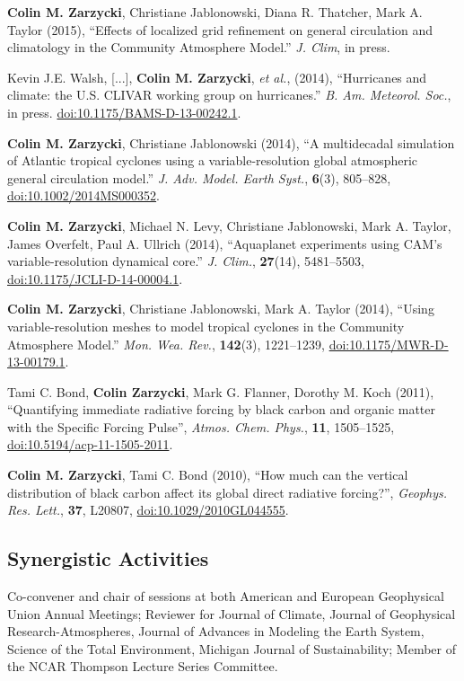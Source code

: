\documentclass[11pt]{article}
\begin{document}
\begin{bibenum}[itemsep=0pt]
\item {\bf Colin M. Zarzycki}, Christiane Jablonowski, Diana R. Thatcher, Mark A. Taylor (2015), ``Effects of localized grid refinement on general circulation and climatology in the Community Atmosphere Model.'' {\em J. Clim}, in press.
\item Kevin J.E. Walsh, [...], {\bf Colin M. Zarzycki}, {\it et al.}, (2014), ``Hurricanes and climate: the U.S. CLIVAR working group on hurricanes.'' {\em B. Am. Meteorol. Soc.}, in press. \href{http://dx.doi.org/10.1175/BAMS-D-13-00242.1}{doi:10.1175/BAMS-D-13-00242.1}.
\item {\bf Colin M. Zarzycki}, Christiane Jablonowski (2014), ``A multidecadal simulation of Atlantic tropical cyclones using a variable-resolution global atmospheric general circulation model.'' {\em J. Adv. Model. Earth Syst.}, {\bf6}(3), 805--828, \href{http://dx.doi.org/10.1002/2014MS000352}{doi:10.1002/2014MS000352}.
\item {\bf Colin M. Zarzycki}, Michael N. Levy, Christiane Jablonowski, Mark A. Taylor, James Overfelt, Paul A. Ullrich (2014), ``Aquaplanet experiments using CAM's variable-resolution dynamical core.'' {\em J. Clim.}, {\bf27}(14), 5481--5503, \href{http://dx.doi.org/10.1175/JCLI-D-14-00004.1}{doi:10.1175/JCLI-D-14-00004.1}.
\item {\bf Colin M. Zarzycki}, Christiane Jablonowski, Mark A. Taylor (2014), ``Using variable-resolution meshes to model tropical cyclones in the Community Atmosphere Model.'' {\em Mon. Wea. Rev.}, {\bf142}(3), 1221--1239,  \href{http://dx.doi.org/10.1175/MWR-D-13-00179.1}{doi:10.1175/MWR-D-13-00179.1}.
\item Tami C. Bond, {\bf Colin Zarzycki}, Mark G. Flanner, Dorothy M. Koch (2011), ``Quantifying immediate radiative forcing by black carbon and organic matter with the Specific Forcing Pulse'', {\em Atmos. Chem. Phys.}, {\bf11}, 1505--1525, \href{http://dx.doi.org/10.5194/acp-11-1505-2011}{doi:10.5194/acp-11-1505-2011}.
\item {\bf Colin M. Zarzycki}, Tami C. Bond (2010), ``How much can the vertical distribution of black carbon affect its global direct radiative forcing?'', {\em Geophys. Res. Lett.}, {\bf37}, L20807, \href{http://dx.doi.org/10.1029/2010GL044555}{doi:10.1029/2010GL044555}. 
\end{bibenum}

\subsection*{Synergistic Activities}

Co-convener and chair of sessions at both American and European Geophysical Union Annual Meetings; Reviewer for Journal of Climate, Journal of Geophysical Research-Atmospheres, Journal of Advances in Modeling the Earth System, Science of the Total Environment, Michigan Journal of Sustainability; Member of the NCAR Thompson Lecture Series Committee.

\end{document}
